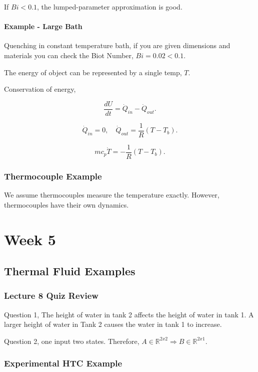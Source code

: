 \documentclass[12pt, a4paper]{report}
\begin{document}
  If $ Bi < 0.1 $, the lumped-parameter approximation is good.

  \subsection{Example - Large Bath}

  Quenching in constant temperature bath, if you are given dimensions and materials you can check the Biot Number, $ Bi = 0.02 < 0.1. $

  The energy of object can be represented by a single temp, $ T. $

  Conservation of energy,

  \[
      \frac{dU}{dt} = \dot Q_{in} - \dot Q_{out}
    .\]

  \[
      \dot Q_{in} = 0, \quad \dot Q_{out} = \frac{1}{R}(T - T_b)
    .\]

  \[
      mc_p\dot T = -\frac{1}{R}(T - T_b)
    .\]

  \section{Thermocouple Example}

  We assume thermocouples measure the temperature exactly. However, thermocouples have their own dynamics.



  \part{Week 5}

  \chapter{Thermal Fluid Examples}

  \section{Lecture 8 Quiz Review}

  Question 1, The height of water in tank 2 affects the height of water in tank 1. A larger height of water in Tank 2 causes the water in tank 1 to increase.

  Question 2, one input two states. Therefore, $ A \in \mathbb{R}^{2x2} \Rightarrow B \in \mathbb{R}^{2x1}. $

  \section{Experimental HTC Example}
\end{document}
